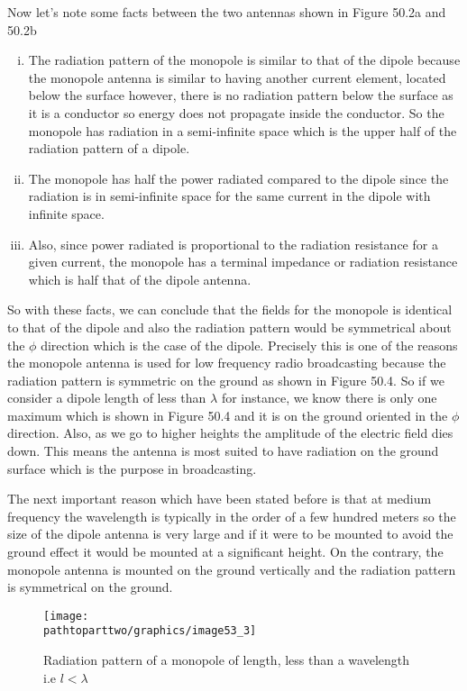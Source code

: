 Now let's note some facts between the two antennas shown in Figure 50.2a and 50.2b
\begin{enumerate}[(i)]
\item The radiation pattern of the monopole is similar to that of the dipole because the monopole antenna is similar to having another current element, located below the surface however, there is no radiation pattern below the surface as it is a conductor so energy does not propagate inside the conductor. So the monopole has radiation in a semi-infinite space which is the upper half of the radiation pattern of a dipole.
\item The monopole has half the power radiated compared to the dipole since the radiation is in semi-infinite space for the same current in the dipole with infinite space.
\item Also, since power radiated is proportional to the radiation resistance for a given current, the monopole has a terminal impedance or radiation resistance which is half that of the dipole antenna.
\end{enumerate}
So with these facts, we can conclude that the fields for the monopole is identical to that of the dipole and also the radiation pattern would be symmetrical about the $\phi$ direction which is the case of the dipole. Precisely this is one of the reasons the monopole antenna is used for low frequency radio broadcasting because the radiation pattern is symmetric on the ground as shown in Figure 50.4. So if we consider a dipole length of less than $\lambda$ for instance, we know there is only one maximum which is shown in Figure 50.4 and it is on the ground oriented in the $\phi$ direction. Also, as we go to higher heights the amplitude of the electric field dies down. This means the antenna is most suited to have radiation on the ground surface which is the purpose in broadcasting.

The next important reason which have been stated before is that at medium frequency the wavelength is typically in the order of a few hundred meters so the size of the dipole antenna is very large and if it were to be mounted to avoid the ground effect it would be mounted at a significant height. On the contrary, the monopole antenna is mounted on the ground vertically and the radiation pattern is symmetrical on the ground.
\begin{figure}[h]
\centering
\texttt{[image: \\pathtoparttwo/graphics/image53\_3]}
\caption{Radiation pattern of a monopole of length, less than a wavelength i.e $l < \lambda$}
\label{fig:fig3}
\end{figure}


